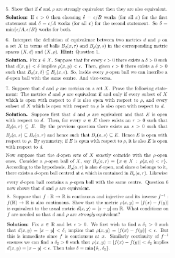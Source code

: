 \documentclass[8pt,landscape]{article}
\begin{document}
\begin{multicols}{3}
    \includegraphics[width=270]{093.png} \\
    \includegraphics[width=270]{094.png} \\
    \includegraphics[width=270]{095.png} \\
    \includegraphics[width=270]{096.png} \\
    \includegraphics[width=270]{097.png} \\
    \includegraphics[width=270]{098.png} \\

\end{multicols}
\end{document}
